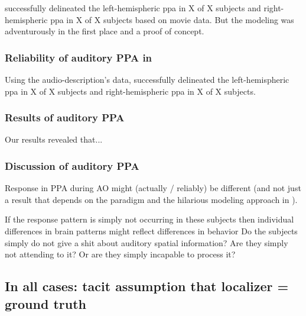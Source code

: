 \citet{haeusler2022processing} successfully delineated the left-hemispheric
\ac{ppa} in X of X subjects and right-hemispheric \ac{ppa} in X of X subjects
based on movie data.
%
But the modeling was adventurously in the first place and a proof of concept.


\subsubsection{Reliability of auditory PPA in \citet{haeusler2022processing}}


Using the audio-description's data, \citet{haeusler2022processing} successfully
delineated the left-hemispheric \ac{ppa} in X of X subjects and
right-hemispheric \ac{ppa} in X of X subjects.


\subsubsection{Results of auditory PPA}

Our results revealed that...


\subsubsection{Discussion of auditory PPA}


%
Response in PPA during AO might (actually / reliably) be different (and not just
a result that depends on the paradigm and the hilarious modeling approach in
\citet{haeusler2022processing}).

%
If the response pattern is simply not occurring in these subjects then
individual differences in brain patterns might reflect differences in behavior
%
Do the subjects simply do not give a shit about auditory spatial information?
%
Are they simply not attending to it? Or are they simply incapable to process it?


\subsection{In all cases: tacit assumption that localizer = ground truth}

